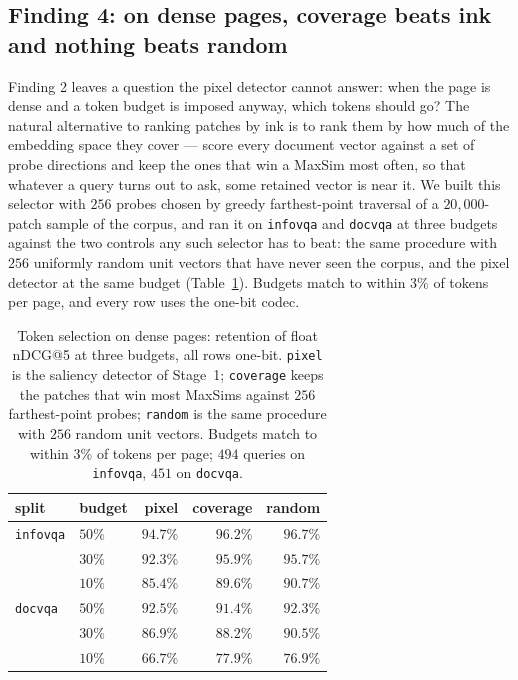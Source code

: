 \documentclass[conference]{IEEEtran}
\begin{document}
\subsection{Finding 4: on dense pages, coverage beats ink and nothing beats random}
\label{sec:selection}
Finding 2 leaves a question the pixel detector cannot answer: when the page is
dense and a token budget is imposed anyway, which tokens should go? The natural
alternative to ranking patches by ink is to rank them by how much of the
embedding space they cover --- score every document vector against a set of
probe directions and keep the ones that win a MaxSim most often, so that
whatever a query turns out to ask, some retained vector is near it. We built
this selector with $256$ probes chosen by greedy farthest-point traversal of a
$20{,}000$-patch sample of the corpus, and ran it on \texttt{infovqa} and
\texttt{docvqa} at three budgets against the two controls any such selector has
to beat: the same procedure with $256$ uniformly random unit vectors that have
never seen the corpus, and the pixel detector at the same budget
(Table~\ref{tab:selection}). Budgets match to within $3\%$ of tokens per page,
and every row uses the one-bit codec.

\begin{table}[!t]
\caption{Token selection on dense pages: retention of float nDCG@5 at three
budgets, all rows one-bit. \texttt{pixel} is the saliency detector of Stage~1;
\texttt{coverage} keeps the patches that win most MaxSims against $256$
farthest-point probes; \texttt{random} is the same procedure with $256$ random
unit vectors. Budgets match to within $3\%$ of tokens per page; $494$ queries on
\texttt{infovqa}, $451$ on \texttt{docvqa}.}
\label{tab:selection}
\centering
\footnotesize
\setlength{\tabcolsep}{4pt}
\begin{tabular}{@{}llrrr@{}}
\toprule
split & budget & pixel & coverage & random \\
\midrule
\texttt{infovqa} & $50\%$ & $94.7\%$ & $96.2\%$ & $96.7\%$ \\
 & $30\%$ & $92.3\%$ & $95.9\%$ & $95.7\%$ \\
 & $10\%$ & $85.4\%$ & $89.6\%$ & $90.7\%$ \\
\texttt{docvqa} & $50\%$ & $92.5\%$ & $91.4\%$ & $92.3\%$ \\
 & $30\%$ & $86.9\%$ & $88.2\%$ & $90.5\%$ \\
 & $10\%$ & $66.7\%$ & $77.9\%$ & $76.9\%$ \\
\bottomrule
\end{tabular}
\end{table}
\end{document}
